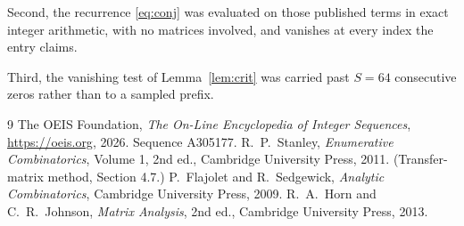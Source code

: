 \documentclass[11pt,a4paper]{article}
\theoremstyle{plain}
\theoremstyle{definition}
\begin{document}
Second, the recurrence \eqref{eq:conj} was evaluated on those published terms in exact
integer arithmetic, with no matrices involved, and vanishes at every index the entry claims.

Third, the vanishing test of Lemma~\ref{lem:crit} was carried past $S=64$ consecutive
zeros rather than to a sampled prefix.

\begin{thebibliography}{9}
 The OEIS Foundation, \emph{The On-Line Encyclopedia of Integer
Sequences}, \url{https://oeis.org}, 2026. Sequence A305177.
 R.~P.~Stanley, \emph{Enumerative Combinatorics}, Volume 1, 2nd ed.,
Cambridge University Press, 2011. (Transfer-matrix method, Section 4.7.)
 P.~Flajolet and R.~Sedgewick, \emph{Analytic Combinatorics}, Cambridge
University Press, 2009.
 R.~A.~Horn and C.~R.~Johnson, \emph{Matrix Analysis}, 2nd ed., Cambridge
University Press, 2013.
\end{thebibliography}
\end{document}
